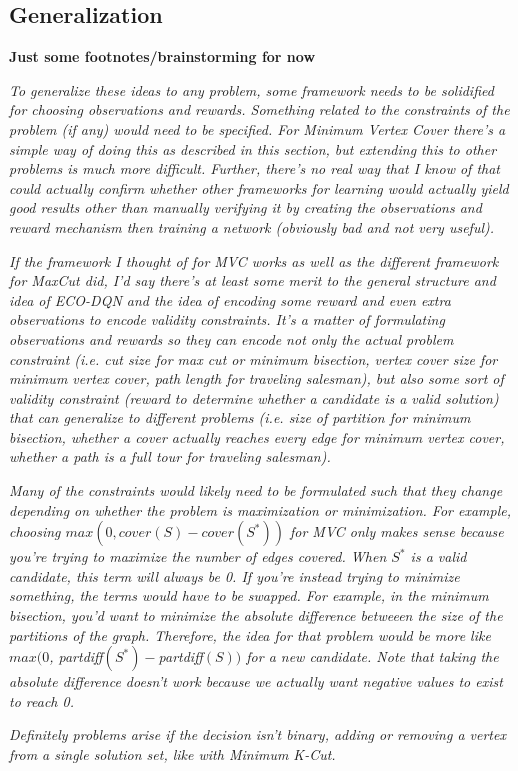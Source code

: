\documentclass{article}
\begin{document}
\subsection{Generalization}

\textbf{Just some footnotes/brainstorming for now}

\textit{To generalize these ideas to any problem, some framework needs to be solidified for choosing observations and rewards. Something related to the constraints of the problem (if any) would need to be specified. For Minimum Vertex Cover there's a simple way of doing this as described in this section, but extending this to other problems is much more difficult. Further, there's no real way that I know of that could actually confirm whether other frameworks for learning would actually yield good results other than manually verifying it by creating the observations and reward mechanism then training a network (obviously bad and not very useful).}

\textit{If the framework I thought of for MVC works as well as the different framework for MaxCut did, I'd say there's at least some merit to the general structure and idea of ECO-DQN and the idea of encoding some reward and even extra observations to encode validity constraints. It's a matter of formulating observations and rewards so they can encode not only the actual problem constraint (i.e. cut size for max cut or minimum bisection, vertex cover size for minimum vertex cover, path length for traveling salesman), but also some sort of validity constraint (reward to determine whether a candidate is a valid solution) that can generalize to different problems (i.e. size of partition for minimum bisection, whether a cover actually reaches every edge for minimum vertex cover, whether a path is a full tour for traveling salesman).}

\textit{Many of the constraints would likely need to be formulated such that they change depending on whether the problem is maximization or minimization. For example, choosing $max(0, cover(S) - cover(S^*))$ for MVC only makes sense because you're trying to maximize the number of edges covered. When $S^*$ is a valid candidate, this term will always be 0. If you're instead trying to minimize something, the terms would have to be swapped. For example, in the minimum bisection, you'd want to minimize the absolute difference betweeen the size of the partitions of the graph. Therefore, the idea for that problem would be more like $max(0$, partdiff$(S^*) - $partdiff$(S))$ for a new candidate. Note that taking the absolute difference doesn't work because we actually want negative values to exist to reach 0.}

\textit{Definitely problems arise if the decision isn't binary, adding or removing a vertex from a single solution set, like with Minimum K-Cut.}



\end{document}
